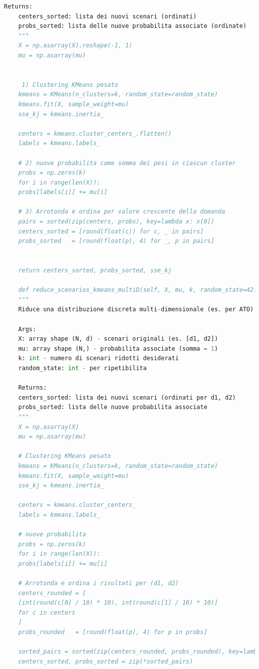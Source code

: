\documentclass[a4paper,12pt]{article}
\begin{document}
\begin{lstlisting}[language=python,caption={class ScenarioTree},label={lst:class-scenario-tree}]
	Returns:
	centers_sorted: lista dei nuovi scenari (ordinati)
	probs_sorted: lista delle nuove probabilita associate (ordinate)
	"""
	X = np.asarray(X).reshape(-1, 1)
	mu = np.asarray(mu)
	
	
	 1) Clustering KMeans pesato
	kmeans = KMeans(n_clusters=k, random_state=random_state)
	kmeans.fit(X, sample_weight=mu)
	sse_kj = kmeans.inertia_
	
	centers = kmeans.cluster_centers_.flatten()
	labels = kmeans.labels_
	
	# 2) nuove probabilita come somma dei pesi in ciascun cluster
	probs = np.zeros(k)
	for i in range(len(X)):
	probs[labels[i]] += mu[i]
	
	# 3) Arrotonda e ordina per valore crescente della domanda
	pairs = sorted(zip(centers, probs), key=lambda x: x[0])
	centers_sorted = [round(float(c)) for c, _ in pairs]
	probs_sorted   = [round(float(p), 4) for _, p in pairs]
	
	
	return centers_sorted, probs_sorted, sse_kj
	
	def reduce_scenarios_kmeans_multiD(self, X, mu, k, random_state=42):
	"""
	Riduce una distribuzione discreta multi-dimensionale (es. per ATO) usando clustering KMeans pesato.
	
	Args:
	X: array shape (N, d) - scenari originali (es. [d1, d2])
	mu: array shape (N,) - probabilita associate (somma = 1)
	k: int - numero di scenari ridotti desiderati
	random_state: int - per ripetibilita
	
	Returns:
	centers_sorted: lista dei nuovi scenari (ordinati per d1, d2)
	probs_sorted: lista delle nuove probabilita associate
	"""
	X = np.asarray(X)
	mu = np.asarray(mu)
	
	# Clustering KMeans pesato
	kmeans = KMeans(n_clusters=k, random_state=random_state)
	kmeans.fit(X, sample_weight=mu)
	sse_kj = kmeans.inertia_
	
	centers = kmeans.cluster_centers_
	labels = kmeans.labels_
	
	# nuove probabilita
	probs = np.zeros(k)
	for i in range(len(X)):
	probs[labels[i]] += mu[i]
	
	# Arrotonda e ordina i risultati per (d1, d2)
	centers_rounded = [
	[int(round(c[0] / 10) * 10), int(round(c[1] / 10) * 10)]
	for c in centers
	]
	probs_rounded   = [round(float(p), 4) for p in probs]
	
	sorted_pairs = sorted(zip(centers_rounded, probs_rounded), key=lambda x: (x[0][0], x[0][1]))
	centers_sorted, probs_sorted = zip(*sorted_pairs)
	

\end{lstlisting}
\end{document}
